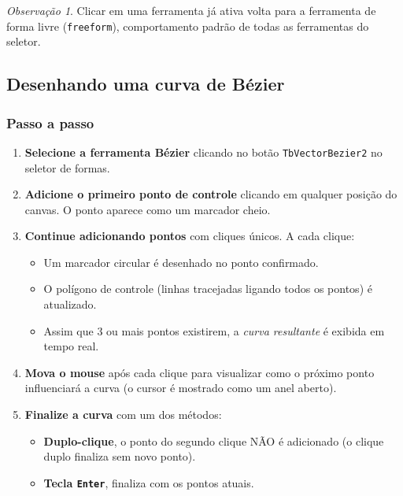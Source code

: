 \documentclass[12pt, a4paper]{article}
\theoremstyle{remark}
\newtheorem{obs}{Observação}[section]
\newcommand{\code}[1]{\texttt{#1}}
\begin{document}
\begin{obs}
Clicar em uma ferramenta já ativa volta para a ferramenta de forma livre
(\code{freeform}), comportamento padrão de todas as ferramentas do seletor.
\end{obs}

\subsection{Desenhando uma curva de Bézier}

\subsubsection*{Passo a passo}

\begin{enumerate}[leftmargin=1.6cm, label=\textbf{Passo \arabic*.}]

    \item \textbf{Selecione a ferramenta Bézier} clicando no botão
          \texttt{TbVectorBezier2} no seletor de formas.

    \item \textbf{Adicione o primeiro ponto de controle} clicando em qualquer
          posição do canvas. O ponto aparece como um marcador cheio.

    \item \textbf{Continue adicionando pontos} com cliques únicos. A cada
          clique:
          \begin{itemize}
              \item Um marcador circular é desenhado no ponto confirmado.
              \item O polígono de controle (linhas tracejadas ligando todos os
                    pontos) é atualizado.
              \item Assim que 3 ou mais pontos existirem, a \emph{curva
                    resultante} é exibida em tempo real.
          \end{itemize}

    \item \textbf{Mova o mouse} após cada clique para visualizar como o próximo
          ponto influenciará a curva (o cursor é mostrado como um anel aberto).

    \item \textbf{Finalize a curva} com um dos métodos:
          \begin{itemize}
              \item \textbf{Duplo-clique}, o ponto do segundo clique NÃO é
                    adicionado (o clique duplo finaliza sem novo ponto).
              \item \textbf{Tecla \texttt{Enter}}, finaliza com os pontos atuais.
          \end{itemize}


\end{enumerate}
\end{document}
